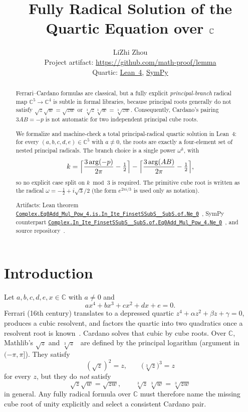 \documentclass[11pt,a4paper]{article}
\title{Fully Radical Solution of the Quartic Equation over \(\C\)}
\author{LiZhi Zhou\\[0.3em]
\small Project artifact: \url{https://github.com/math-proof/lemma}\\[0.2em]
\small Quartic:
\href{http://www.lemma.cn/lean/?module=Complex.Eq0Add_Mul_Pow_4.is.In_Ite_FinsetSSubS__SubS.of.Ne_0}{Lean~4},
\href{http://www.lemma.cn/py/?module=Complex.In_Ite_FinsetSSubS__SubS.of.Eq0Add_Mul_Pow_4.Ne_0}{SymPy}}
\date{}
\newcommand{\C}{\mathbb{C}}
\newcommand{\Arg}{\operatorname{arg}}
\begin{document}
\maketitle

\begin{abstract}
Ferrari--Cardano formulas are classical, but a fully explicit \emph{principal-branch} radical map
\(\C^5\to\C^4\) is subtle in formal libraries, because principal roots generally do not satisfy
\(\sqrt{z}\sqrt{w}=\sqrt{zw}\) or \(\sqrt[3]{z}\sqrt[3]{w}=\sqrt[3]{zw}\).
Consequently, Cardano's pairing \(3AB=-p\) is not automatic for two independent principal cube roots.

We formalize and machine-check a total principal-radical quartic solution in Lean~4:
for every \((a,b,c,d,e)\in\C^5\) with \(a\neq 0\), the roots are exactly a four-element set of nested principal radicals.
The branch choice is a single power \(\omega^k\), with
\[
k=\Bigl\lceil\frac{3\Arg(-p)}{2\pi}-\tfrac12\Bigr\rceil
-\Bigl\lceil\frac{3\Arg(AB)}{2\pi}-\tfrac12\Bigr\rceil,
\]
so no explicit case split on \(k\bmod 3\) is required.
The primitive cube root is written as the radical
\(\omega=-\tfrac12+i\sqrt{3}/2\) (the form \(e^{2\pi i/3}\) is used only as notation).

Artifacts: Lean theorem
\href{http://www.lemma.cn/lean/?module=Complex.Eq0Add_Mul_Pow_4.is.In_Ite_FinsetSSubS__SubS.of.Ne_0}{\nolinkurl{Complex.Eq0Add_Mul_Pow_4.is.In_Ite_FinsetSSubS__SubS.of.Ne_0}}~\cite{lemma_quartic_lean},
SymPy counterpart
\href{http://www.lemma.cn/py/?module=Complex.In_Ite_FinsetSSubS__SubS.of.Eq0Add_Mul_Pow_4.Ne_0}{\nolinkurl{Complex.In_Ite_FinsetSSubS__SubS.of.Eq0Add_Mul_Pow_4.Ne_0}}~\cite{lemma_quartic_sympy},
and source repository~\cite{lemma_repo}.
\end{abstract}

\section{Introduction}
\label{sec:intro}

Let \(a,b,c,d,e,x\in\C\) with \(a\neq 0\) and
\[
a x^4+b x^3+c x^2+d x+e=0.
\]
Ferrari (16th century) translates to a depressed quartic \(z^4+\alpha z^2+\beta z+\gamma=0\), produces a cubic resolvent, and factors the quartic into two quadratics once a resolvent root is known~\cite{cardano1545}.
Cardano solves that cubic by cube roots.
Over \(\C\), Mathlib's \(\sqrt{z}\) and \(\sqrt[3]{z}\)~\cite{mathlib2020,mathlib} are defined by the principal logarithm (argument in \((-\pi,\pi]\)).
They satisfy
\[
(\sqrt{z})^2=z,\qquad \bigl(\sqrt[3]{z}\bigr)^3=z
\]
for every \(z\), but they do \emph{not} satisfy
\[
\sqrt{z}\sqrt{w}=\sqrt{zw},\qquad \sqrt[3]{z}\,\sqrt[3]{w}=\sqrt[3]{zw}
\]
in general.
Any fully radical formula over \(\C\) must therefore name the missing cube root of unity explicitly and select a consistent Cardano pair.
\end{document}
